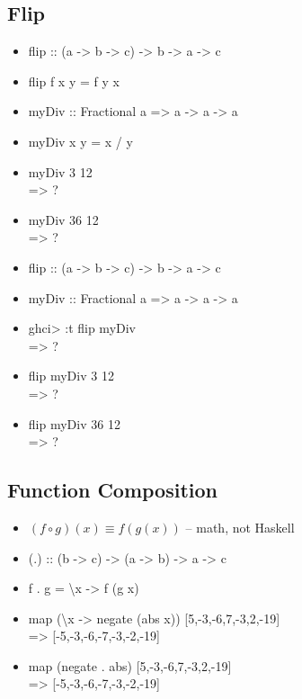 \documentclass{beamer}                  %
\newcommand{\srule}{
	\rule{\textwidth}{1pt}\\
}
\newlength{\subsecwidth}
\newenvironment{slide}{
	\begin{frame} %
	\settowidth{\subsecwidth}{\insertsubsection} %
	\ifthenelse{\dimtest{\subsecwidth}{<}{1pt}}{ %
		\frametitle{\insertsection\\             %
		\vspace{-1ex}                            %
		\color{fore}\srule                       %
		\par                                     %
		\vspace{-3ex}                            %
		}
	}{                                           %
		\frametitle{\insertsection\ -- \insertsubsection\\ %
		\vspace{-1ex}                            %
		\color{fore}\srule                       %
		\par                                     %
		\vspace{-3ex}                            %
		}
	}
	\Large                                       %
}{
	\end{frame}
}
\begin{document}
\subsection{Flip}
\begin{slide}
  \begin{itemize}
    \item flip :: (a -> b -> c) -> b -> a -> c
    \item flip f x y = f y x
  \end{itemize}
\end{slide}

\begin{slide}
  \begin{itemize}
    \item myDiv :: Fractional a => a -> a -> a
    \item myDiv x y = x / y
    \item myDiv 3 12\\
      => ?
    \item myDiv 36 12\\
      => ?
  \end{itemize}
\end{slide}

\begin{slide}
  \begin{itemize}
    \item flip :: (a -> b -> c) -> b -> a -> c
    \item myDiv :: Fractional a => a -> a -> a
    \item ghci> :t flip myDiv\\
      => ?
    \item flip myDiv 3 12\\
      => ?
    \item flip myDiv 36 12\\
      => ?
  \end{itemize}
\end{slide}

\subsection{Function Composition}

\begin{slide}
  \begin{itemize}
    \item \((f \circ g)(x) \equiv f(g(x))\) -- math, not Haskell
    \item (.) :: (b -> c) -> (a -> b) -> a -> c
    \item f . g = \textbackslash x -> f (g x)
    \item{}{}
      map (\textbackslash x -> negate (abs x)) [5,-3,-6,7,-3,2,-19]\\
      => [-5,-3,-6,-7,-3,-2,-19]
    \item{}{}
      map (negate . abs) [5,-3,-6,7,-3,2,-19]\\
      => [-5,-3,-6,-7,-3,-2,-19]
  \end{itemize}
\end{slide}
\end{document}
